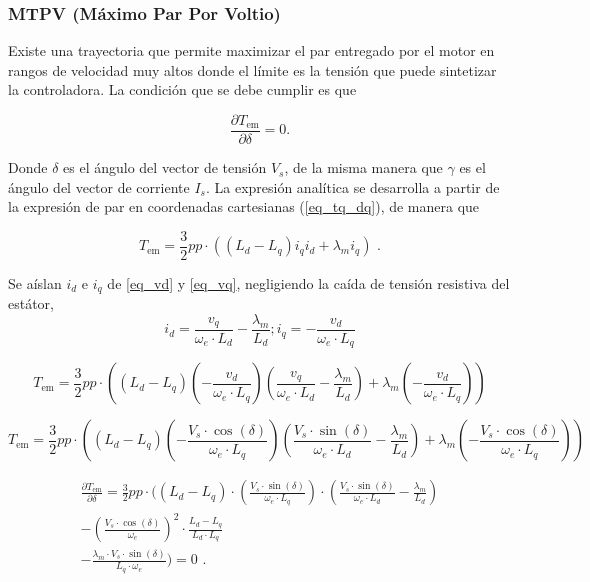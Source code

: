 \subsubsection{MTPV (Máximo Par Por Voltio)}

Existe una trayectoria que permite maximizar el par entregado por el motor en rangos de velocidad muy altos donde el límite es la tensión que puede sintetizar la controladora. La condición que se debe cumplir es que

\begin{equation}
\frac{\partial T_{\text{em}}}{\partial \delta} = 0 \text{.}
\end{equation}

Donde $\delta$ es el ángulo del vector de tensión $V_s$, de la misma manera que $\gamma$ es el ángulo del vector de corriente $I_s$. La expresión analítica se desarrolla a partir de la expresión de par en coordenadas cartesianas (\ref{eq_tq_dq}), de manera que

\begin{equation*}
T_{\text{em}} = \frac{3}{2}pp\cdot((L_d - L_q) i_q i_d + \lambda_m i_q) \text{ .}
\end{equation*}

Se aíslan $i_d$ e $i_q$ de \ref{eq_vd} y \ref{eq_vq}, negligiendo la caída de tensión resistiva del estátor, 
\begin{equation}
i_d = \frac{v_q}{\omega_e \cdot L_d} - \frac{\lambda_m}{L_d}; i_q = -\frac{v_d}{\omega_e \cdot L_q}
\end{equation}

\begin{equation}
T_{\text{em}} = \frac{3}{2}pp\cdot\left((L_d - L_q) (-\frac{v_d}{\omega_e \cdot L_q}) (\frac{v_q}{\omega_e \cdot L_d} - \frac{\lambda_m}{L_d}) + \lambda_m (-\frac{v_d}{\omega_e \cdot L_q})\right)
\end{equation}

\begin{equation}
T_{\text{em}} = \frac{3}{2}pp\cdot\left((L_d - L_q) (-\frac{V_s \cdot \cos(\delta)}{\omega_e \cdot L_q}) (\frac{V_s \cdot \sin(\delta)}{\omega_e \cdot L_d} - \frac{\lambda_m}{L_d}) + \lambda_m (-\frac{V_s \cdot \cos(\delta)}{\omega_e \cdot L_q})\right)
\end{equation}

\begin{equation}
\begin{split}
\frac{\partial T_{\text{em}}}{\partial \delta} = \frac{3}{2}pp\cdot (
(L_d - L_q) \cdot (\frac{V_s \cdot \sin(\delta)}{\omega_e \cdot L_q}) \cdot (\frac{V_s \cdot \sin(\delta)}{\omega_e \cdot L_d} - \frac{\lambda_m}{L_d})\\
-\left(\frac{V_s \cdot \cos(\delta)}{\omega_e}\right)^2 \cdot \frac{L_d - L_q}{L_d\cdot L_q}\\ 
-\frac{\lambda_m \cdot V_s \cdot \sin(\delta)}{L_q \cdot \omega_e} ) = 0  \text{ .}
\end{split}
\end{equation}

